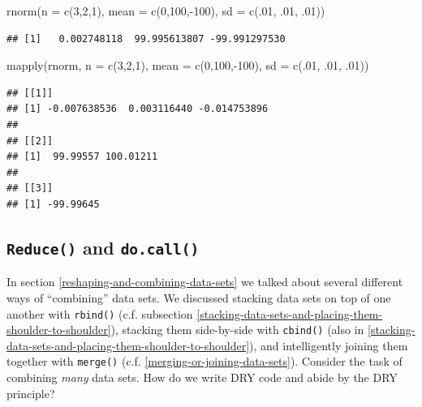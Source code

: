 \documentclass[
  12pt,
]{krantz}
\makeatletter
\newenvironment{Shaded}{\begin{snugshade}}{\end{snugshade}}
\newcommand{\AttributeTok}[1]{\textcolor[rgb]{0.61,0.61,0.61}{#1}}
\newcommand{\DecValTok}[1]{\textcolor[rgb]{0.06,0.06,0.06}{#1}}
\newcommand{\FunctionTok}[1]{\textcolor[rgb]{0,0,0}{#1}}
\newcommand{\NormalTok}[1]{#1}
\newcommand{\SpecialCharTok}[1]{\textcolor[rgb]{0,0,0}{#1}}
\newenvironment{kframe}{%
\medskip{}
\setlength{\fboxsep}{.8em}
 \def\at@end@of@kframe{}%
 \ifinner\ifhmode%
  \def\at@end@of@kframe{\end{minipage}}%
  \begin{minipage}{\columnwidth}%
 \fi\fi%
 \def\FrameCommand##1{\hskip\@totalleftmargin \hskip-\fboxsep
 \colorbox{shadecolor}{##1}\hskip-\fboxsep
     \hskip-\linewidth \hskip-\@totalleftmargin \hskip\columnwidth}%
 \MakeFramed {\advance\hsize-\width
   \@totalleftmargin\z@ \linewidth\hsize
   \@setminipage}}%
 {\par\unskip\endMakeFramed%
 \at@end@of@kframe}
\renewenvironment{Shaded}{\begin{kframe}}{\end{kframe}}
\makeatother
\begin{document}
\begin{Shaded}
\begin{Highlighting}[]
\FunctionTok{rnorm}\NormalTok{(}\AttributeTok{n =} \FunctionTok{c}\NormalTok{(}\DecValTok{3}\NormalTok{,}\DecValTok{2}\NormalTok{,}\DecValTok{1}\NormalTok{), }\AttributeTok{mean =} \FunctionTok{c}\NormalTok{(}\DecValTok{0}\NormalTok{,}\DecValTok{100}\NormalTok{,}\SpecialCharTok{{-}}\DecValTok{100}\NormalTok{), }\AttributeTok{sd =} \FunctionTok{c}\NormalTok{(.}\DecValTok{01}\NormalTok{, .}\DecValTok{01}\NormalTok{, .}\DecValTok{01}\NormalTok{))}
\end{Highlighting}
\end{Shaded}

\begin{verbatim}
## [1]   0.002748118  99.995613807 -99.991297530
\end{verbatim}

\begin{Shaded}
\begin{Highlighting}[]
\FunctionTok{mapply}\NormalTok{(rnorm, }\AttributeTok{n =} \FunctionTok{c}\NormalTok{(}\DecValTok{3}\NormalTok{,}\DecValTok{2}\NormalTok{,}\DecValTok{1}\NormalTok{), }\AttributeTok{mean =} \FunctionTok{c}\NormalTok{(}\DecValTok{0}\NormalTok{,}\DecValTok{100}\NormalTok{,}\SpecialCharTok{{-}}\DecValTok{100}\NormalTok{), }\AttributeTok{sd =} \FunctionTok{c}\NormalTok{(.}\DecValTok{01}\NormalTok{, .}\DecValTok{01}\NormalTok{, .}\DecValTok{01}\NormalTok{))}
\end{Highlighting}
\end{Shaded}

\begin{verbatim}
## [[1]]
## [1] -0.007638536  0.003116440 -0.014753896
## 
## [[2]]
## [1]  99.99557 100.01211
## 
## [[3]]
## [1] -99.99645
\end{verbatim}

\hypertarget{reduce-and-do.call}{%
\subsection{\texorpdfstring{\texttt{Reduce()} and \texttt{do.call()}}{Reduce() and do.call()}}\label{reduce-and-do.call}}

In section \ref{reshaping-and-combining-data-sets} we talked about several different ways of ``combining'' data sets. We discussed stacking data sets on top of one another with \texttt{rbind()} (c.f. subsection \ref{stacking-data-sets-and-placing-them-shoulder-to-shoulder}), stacking them side-by-side with \texttt{cbind()} (also in \ref{stacking-data-sets-and-placing-them-shoulder-to-shoulder}), and intelligently joining them together with \texttt{merge()} (c.f. \ref{merging-or-joining-data-sets}). Consider the task of combining \emph{many} data sets. How do we write DRY code and abide by the DRY principle?
\end{document}
